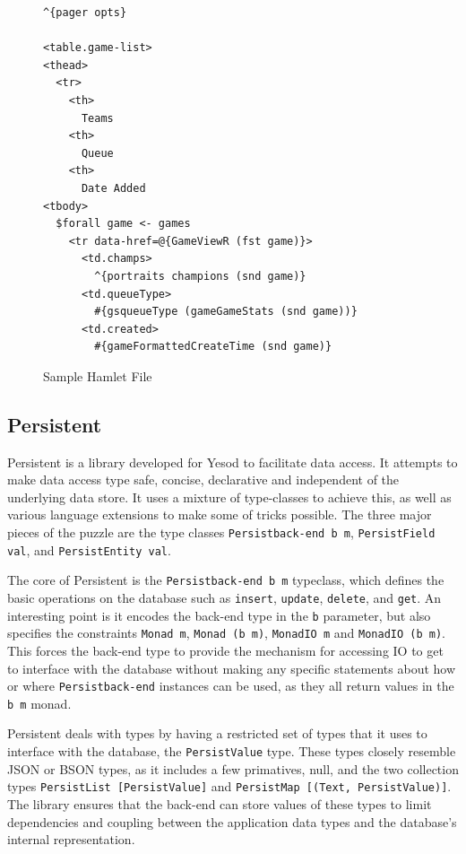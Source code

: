 \documentclass{chi2009}
\newcommand{\code}[1]{\texttt{#1}}
\begin{document}
\begin{figure}[]
\begin{verbatim}
^{pager opts}

<table.game-list>
<thead>
  <tr>
    <th>
      Teams
    <th>
      Queue
    <th>
      Date Added
<tbody>
  $forall game <- games
    <tr data-href=@{GameViewR (fst game)}>
      <td.champs>
        ^{portraits champions (snd game)}
      <td.queueType>
        #{gsqueueType (gameGameStats (snd game))}
      <td.created>
        #{gameFormattedCreateTime (snd game)}
\end{verbatim}
    \caption{Sample Hamlet File}
    \label{hamlet}
\end{figure}

\subsection{Persistent}

Persistent is a library developed for Yesod to facilitate data access.  It attempts to make data access type safe, concise, declarative and independent of the underlying data store.  It uses a mixture of type-classes to achieve this, as well as various language extensions to make some of tricks possible.  The three major pieces of the puzzle are the type classes \code{Persistback-end b m}, \code{PersistField val}, and \code{PersistEntity val}.

The core of Persistent is the \code{Persistback-end b m} typeclass, which defines the basic operations on the database such as \code{insert}, \code{update}, \code{delete}, and \code{get}.  An interesting point is it encodes the back-end type in the \code{b} parameter, but also specifies the constraints \code{Monad m}, \code{Monad (b m)}, \code{MonadIO m} and \code{MonadIO (b m)}.  This forces the back-end type to provide the mechanism for accessing IO to get to interface with the database without making any specific statements about how or where \code{Persistback-end} instances can be used, as they all return values in the \code{b m} monad.

Persistent deals with types by having a restricted set of types that it uses to interface with the database, the \code{PersistValue} type.  These types closely resemble JSON or BSON types, as it includes a few primatives, null, and the two collection types \code{PersistList [PersistValue]} and \code{PersistMap [(Text, PersistValue)]}.  The library ensures that the back-end can store values of these types to limit dependencies and coupling between the application data types and the database's internal representation.
\end{document}

